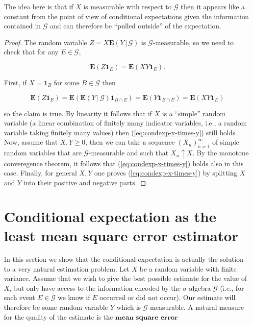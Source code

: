 \documentclass[11pt]{report}
\theoremstyle{plain}
\theoremstyle{definition}
\begin{document}
\begin{enumerate}[label=\arabic*.]
The idea here is that if $X$ is measurable with respect to $\mathcal{G}$ then it appears like a constant from the point of view of conditional expectations given the information contained in $\mathcal{G}$ and can therefore be ``pulled outside'' of the expectation.

\begin{proof}
The random variable $Z=X\mathbf{E}\left(Y\,|\,\mathcal{G}\right)$ is $\mathcal{G}$-measurable, so we need to check that for any $E\in \mathcal{G}$,

\begin{equation*} \tag{7}\label{eq:condexp-x-times-y}
\mathbf{E}(Z\mathbf{1}_E) = \mathbf{E}(XY \mathbf{1}_E).
\end{equation*}

First, if $X=\mathbf{1}_B$ for some $B\in\mathcal{G}$ then

\[
\mathbf{E}(Z \mathbf{1}_E) = \mathbf{E}(\mathbf{E}\left(Y\,|\,\mathcal{G}\right)\mathbf{1}_{B\cap E}) = \mathbf{E}(Y\mathbf{1}_{B\cap E})
= \mathbf{E}(XY \mathbf{1}_E)
\]

so the claim is true. By linearity it follows that if $X$ is a ``simple'' random variable (a linear combination of finitely many indicator variables, i.e., a random variable taking finitely many values) then (\ref{eq:condexp-x-times-y}) still holds. Now, assume that $X,Y\ge 0$, then we can take a sequence $(X_n)_{n=1}^\infty$ of simple random variables that are $\mathcal{G}$-measurable and such that $X_n\uparrow X$. By the monotone converegence theorem, it follows that (\ref{eq:condexp-x-times-y}) holds also in this case. Finally, for general $X,Y$ one proves (\ref{eq:condexp-x-times-y}) by splitting $X$ and $Y$ into their positive and negative parts.
\end{proof}
\end{enumerate}

\section{Conditional expectation as the least mean square error estimator}
In this section we show that the conditional expectation is actually the solution to a very natural estimation problem. Let $X$ be a random variable with finite variance. Assume that we wish to give the best possible estimate for the value of $X$, but only have access to the information encoded by the $\sigma$-algebra $\mathcal{G}$ (i.e., for each event $E\in\mathcal{G}$ we know if $E$ occurred or did not occur). Our estimate will therefore be some random variable $Y$ which is $\mathcal{G}$-measurable. A natural measure for the quality of the estimate is the $\textbf{mean square error}$
\end{document}
